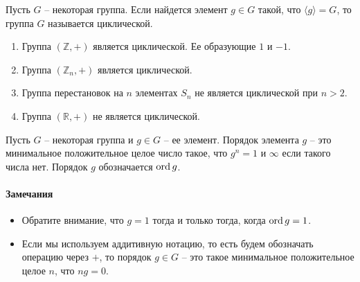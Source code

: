 \begin{definition}
Пусть $G$ -- некоторая группа.
Если найдется элемент $g\in G$ такой, что $\langle g\rangle = G$, то группа $G$ называется циклической.
\end{definition}


\begin{examples}
\begin{enumerate}
\item Группа $(\mathbb Z, +)$ является циклической.
Ее образующие $1$ и $-1$.

\item Группа $(\mathbb Z_n, +)$ является циклической.

\item Группа перестановок на $n$ элементах $S_n$ не является циклической при $n > 2$.

\item Группа $(\mathbb R, +)$ не является циклической.
\end{enumerate}
\end{examples}

\begin{definition}
Пусть $G$ -- некоторая группа и $g\in G$ -- ее элемент.
Порядок элемента $g$ -- это минимальное положительное целое число такое, что $g^n = 1$ и $\infty$ если такого числа нет.
Порядок $g$ обозначается $\operatorname{ord} g$.
\end{definition}

\paragraph{Замечания}

\begin{itemize}
\item Обратите внимание, что $g  = 1$ тогда и только тогда, когда $\operatorname{ord} g = 1$.

\item Если мы используем аддитивную нотацию, то есть будем обозначать операцию через $+$, то порядок $g\in G$ -- это такое минимальное положительное целое $n$, что $n g = 0$.
\end{itemize}

